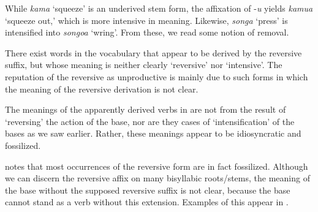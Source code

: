 \documentclass[output=paper]{langsci/langscibook}
\begin{document}
\ea\label{ex:ngonyaningowa:8}
\ea\label{ex:ngonyaningowa:8a}   
\ex\label{ex:ngonyaningowa:8b}
\ex\label{ex:ngonyaningowa:8c}
\z 
\z 

While \textit{kama} ‘squeeze’ is an underived stem form, the affixation of -\textit{u} yields \textit{kamua} ‘squeeze out,’ which is more intensive in meaning. Likewise, \textit{songa} ‘press’ is intensified into \textit{songoa }‘wring’. From these, we read some notion of removal. 

There exist words in the vocabulary that appear to be derived by the reversive suffix, but whose meaning is neither clearly ‘reversive’ nor ‘intensive’. The reputation of the reversive as unproductive is mainly due to such forms in which the meaning of the reversive derivation is not clear.

\ea\label{ex:ngonyaningowa:9}
\ea\label{ex:ngonyaningowa:9a}
\ex\label{ex:ngonyaningowa:9b}
\ex\label{ex:ngonyaningowa:9c}
\ex\label{ex:ngonyaningowa:9d}
\ex\label{ex:ngonyaningowa:9e}
\z 
\z 

The meanings of the apparently derived verbs in  are not from the result of ‘reversing’ the action of the base, nor are they cases of ‘intensification’ of the bases as we saw earlier. Rather, these meanings appear to be idiosyncratic and fossilized.

\citet[103]{Shepardson1986} notes that most occurrences of the reversive form are in fact fossilized. Although we can discern the reversive affix on many bisyllabic roots/stems, the meaning of the base without the supposed reversive suffix is not clear, because the base cannot stand as a verb without this extension.  Examples of this appear in .

\ea\label{ex:ngonyaningowa:10}
\ea\label{ex:ngonyaningowa:10a}
\ex\label{ex:ngonyaningowa:10b}
\ex\label{ex:ngonyaningowa:10c}
\ex\label{ex:ngonyaningowa:10d}
\ex\label{ex:ngonyaningowa:10e}
\ex\label{ex:ngonyaningowa:10f}
\z 
\z
\end{document}
